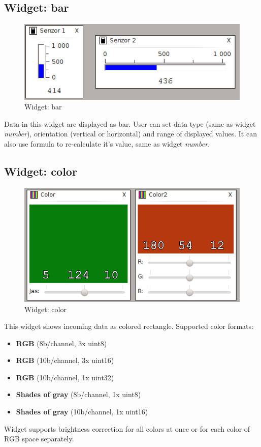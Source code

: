 \documentclass[12pt, a4paper, oneside]{article}
\newcommand{\It}{\textit}  %
\begin{document}
\subsection{Widget: bar}
\begin{figure}[H]
\begin{center}
\includegraphics{img/w_bar.png}
\caption{Widget: bar}
\end{center}
\end{figure}
Data in this widget are displayed as bar. User can set data type (same as widget \It{number}), orientation (vertical or horizontal) and range of displayed values. It can also use formula to re-calculate it's value, same as widget \It{number}.

\subsection{Widget: color}
\begin{figure}[H]
\begin{center}
\includegraphics{img/w_col.png}
\caption{Widget: color}
\end{center}
\end{figure}
This widget shows incoming data as colored rectangle. Supported color formats:
\begin{itemize}
    \item {\bf RGB} (8b/channel, 3x uint8)
    \item {\bf RGB} (10b/channel, 3x uint16)
    \item {\bf RGB} (10b/channel, 1x uint32)
    \item {\bf Shades of gray} (8b/channel, 1x uint8)
    \item {\bf Shades of gray} (10b/channel, 1x uint16)
\end{itemize}
Widget supports brightness correction for all colors at once or for each color of RGB space separately.
\end{document}
